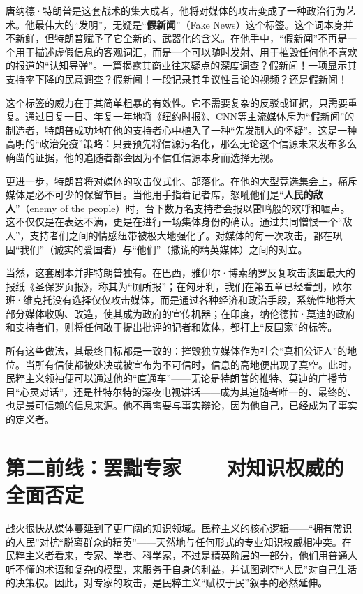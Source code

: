 唐纳德·特朗普是这套战术的集大成者，他将对媒体的攻击变成了一种政治行为艺术。他最伟大的“发明”，无疑是“\textbf{假新闻}”（Fake News）这个标签。这个词本身并不新鲜，但特朗普赋予了它全新的、武器化的含义。在他手中，“假新闻”不再是一个用于描述虚假信息的客观词汇，而是一个可以随时发射、用于摧毁任何他不喜欢的报道的“认知导弹”。一篇揭露其商业往来疑点的深度调查？假新闻！一项显示其支持率下降的民意调查？假新闻！一段记录其争议性言论的视频？还是假新闻！

这个标签的威力在于其简单粗暴的有效性。它不需要复杂的反驳或证据，只需要重复。通过日复一日、年复一年地将《纽约时报》、CNN等主流媒体斥为“假新闻”的制造者，特朗普成功地在他的支持者心中植入了一种“先发制人的怀疑”。这是一种高明的“政治免疫”策略：只要预先将信源污名化，那么无论这个信源未来发布多么确凿的证据，他的追随者都会因为不信任信源本身而选择无视。

更进一步，特朗普将对媒体的攻击仪式化、部落化。在他的大型竞选集会上，痛斥媒体是必不可少的保留节目。当他用手指着记者席，怒吼他们是“\textbf{人民的敌人}”（enemy of the people）时，台下数万名支持者会报以雷鸣般的欢呼和嘘声。这不仅仅是在表达不满，更是在进行一场集体身份的确认。通过共同憎恨一个“敌人”，支持者们之间的情感纽带被极大地强化了。对媒体的每一次攻击，都在巩固“我们”（诚实的爱国者）与“他们”（撒谎的精英媒体）之间的对立。

当然，这套剧本并非特朗普独有。在巴西，雅伊尔·博索纳罗反复攻击该国最大的报纸《圣保罗页报》，称其为“厕所报”；在匈牙利，我们在第五章已经看到，欧尔班·维克托没有选择仅仅攻击媒体，而是通过各种经济和政治手段，系统性地将大部分媒体收购、改造，使其成为政府的宣传机器；在印度，纳伦德拉·莫迪的政府和支持者们，则将任何敢于提出批评的记者和媒体，都打上“反国家”的标签。

所有这些做法，其最终目标都是一致的：摧毁独立媒体作为社会“真相公证人”的地位。当所有信使都被处决或被宣布为不可信时，信息的高地便出现了真空。此时，民粹主义领袖便可以通过他的“直通车”——无论是特朗普的推特、莫迪的广播节目“心灵对话”，还是杜特尔特的深夜电视讲话——成为其追随者唯一的、最终的、也是最可信赖的信息来源。他不再需要与事实辩论，因为他自己，已经成为了事实的定义者。

\section{第二前线：罢黜专家——对知识权威的全面否定}
战火很快从媒体蔓延到了更广阔的知识领域。民粹主义的核心逻辑——“拥有常识的人民”对抗“脱离群众的精英”——天然地与任何形式的专业知识权威相冲突。在民粹主义者看来，专家、学者、科学家，不过是精英阶层的一部分，他们用普通人听不懂的术语和复杂的模型，来服务于自身的利益，并试图剥夺“人民”对自己生活的决策权。因此，对专家的攻击，是民粹主义“赋权于民”叙事的必然延伸。

